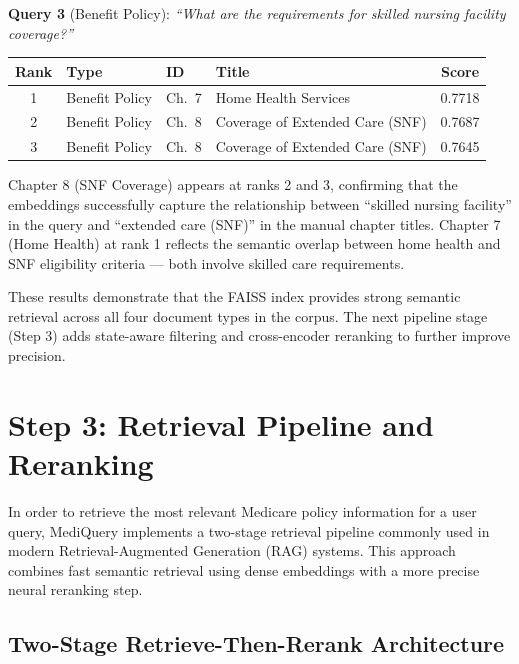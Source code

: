 \documentclass[12pt, letterpaper]{article}
\begin{document}
\textbf{Query 3} (Benefit Policy): \textit{``What are the requirements for skilled
nursing facility coverage?''}

\begin{table}[h]
\centering
\small
\begin{tabular}{@{}clllc@{}}
\toprule
\textbf{Rank} & \textbf{Type} & \textbf{ID} & \textbf{Title} & \textbf{Score} \\
\midrule
1 & Benefit Policy & Ch.\ 7  & Home Health Services           & 0.7718 \\
2 & Benefit Policy & Ch.\ 8  & Coverage of Extended Care (SNF) & 0.7687 \\
3 & Benefit Policy & Ch.\ 8  & Coverage of Extended Care (SNF) & 0.7645 \\
\bottomrule
\end{tabular}
\end{table}

Chapter 8 (SNF Coverage) appears at ranks 2 and 3, confirming that the embeddings
successfully capture the relationship between ``skilled nursing facility'' in the query
and ``extended care (SNF)'' in the manual chapter titles. Chapter 7 (Home Health) at
rank 1 reflects the semantic overlap between home health and SNF eligibility criteria
--- both involve skilled care requirements.

These results demonstrate that the FAISS index provides strong semantic retrieval
across all four document types in the corpus. The next pipeline stage (Step 3) adds
state-aware filtering and cross-encoder reranking to further improve precision.

\section{Step 3: Retrieval Pipeline and Reranking}

In order to retrieve the most relevant Medicare policy information for a user query, MediQuery implements a two-stage retrieval pipeline commonly used in modern Retrieval-Augmented Generation (RAG) systems. This approach combines fast semantic retrieval using dense embeddings with a more precise neural reranking step.

\subsection{Two-Stage Retrieve-Then-Rerank Architecture}
\end{document}
